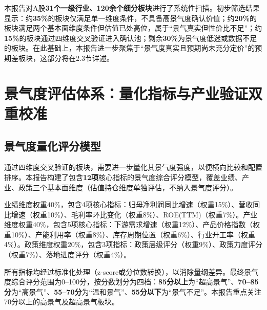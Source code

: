本报告对A股\textbf{31个一级行业、120余个细分板块}进行了系统性扫描。初步筛选结果显示：约\textbf{35\%}的板块仅满足单一维度条件，不具备高景气度确认价值；约\textbf{20\%}的板块满足两个基本面维度条件但估值已处高位，属于“景气真实但性价比不足”；约\textbf{15\%}的板块通过四维度交叉验证进入确认池；剩余\textbf{30\%}为景气度低迷或数据不足的板块。在此基础上，本报告进一步聚焦于“景气度真实且预期尚未充分定价”的预期差板块，这部分将在2.3节详述。

\section{景气度评估体系：量化指标与产业验证双重校准}

\subsection{景气度量化评分模型}

通过四维度交叉验证的板块，需要进一步量化其景气度强度，以便横向比较和配置排序。本报告构建了包含\textbf{12项}核心指标的景气度综合评分模型，覆盖业绩、产业、政策三个基本面维度（估值持仓维度单独评估，不纳入景气度评分）。

业绩维度权重\(40\%\)，包含4项核心指标：归母净利润同比增速（权重15\%）、营收同比增速（权重10\%）、毛利率环比变化（权重8\%）、ROE(TTM)（权重7\%）。产业维度权重\(40\%\)，包含5项核心指标：下游需求增速（权重12\%）、产品价格指数（权重10\%）、产能利用率（权重8\%）、库存周期位置（权重6\%）、行业开工率（权重4\%）。政策维度权重\(20\%\)，包含3项指标：政策层级评分（权重9\%）、政策力度评分（权重7\%）、落地进度评分（权重4\%）。

所有指标均经过标准化处理（z-score或分位数转换），以消除量纲差异。最终景气度综合评分范围为0--100分，按分数划分为四档：\textbf{85分以上}为“超高景气”、\textbf{70--85分}为“高景气”、\textbf{55--70分}为“温和景气”、\textbf{55分以下}为“景气不足”。本报告重点关注70分以上的高景气及超高景气板块。

